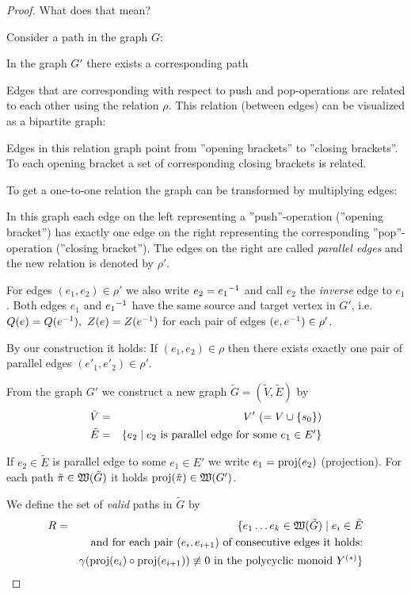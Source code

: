 \begin{proof}
What does that mean?

Consider a path in the graph $G$:

\missingfigure

In the graph $G'$ there exists a corresponding path

\missingfigure

Edges that are corresponding with respect to push and pop-operations are related
to each other using the relation $\rho$. This relation (between edges) can be
visualized as a bipartite graph:

\missingfigure

Edges in this relation graph point from ''opening brackets'' to ''closing
brackets''. To each opening bracket a set of corresponding closing brackets is
related. 

To get a one-to-one relation the graph can be transformed by multiplying edges:

\missingfigure

In this graph each edge on the left representing a ''push''-operation
(''opening bracket'') has exactly one edge on the right representing the
corresponding ''pop''-operation (''closing bracket''). The edges on the right
are called {\em parallel edges} and the new relation is denoted by $\rho'$.

For edges $(e_1, e_2) \in \rho'$ we also write $e_2 = \mbox{${e_1}^{-1}$}$ and call $e_2$
the {\em inverse} edge to $e_1$. Both edges $e_1$ and $\mbox{${e_1}^{-1}$}$ have the same
source and target vertex in $G'$, i.e.\ $Q(e) = Q(\mbox{${e}^{-1}$}),\ Z(e) = Z(\mbox{${e}^{-1}$})$
for each pair of edges $(e, \mbox{${e}^{-1}$}) \in \rho'$.

By our construction it holds: If $(e_1, e_2) \in \rho$ then there exists exactly
one pair of parallel edges $(e'_1, e'_2)  \in \rho'$.

From the graph $G'$ we construct a new graph $\tilde{G} = (\tilde{V},
\tilde{E})$ by
\begin{eqnarray*}
\tilde{V} &=& V' \ (=V \cup \mbox{$\{s_0\}$}) \\
\tilde{E} &=& \mbox{$\{e_2 \mid e_2\text{ is parallel edge for some $e_1 \in E'$}\}$}
\end{eqnarray*}

If $e_2 \in \tilde{E}$ is parallel edge to some $e_1 \in E'$ we write $e_1 =
\mathrm{proj}({e_2})$ (projection). For each path $\tilde{\pi} \in \mbox{$\mathfrak{W}({\tilde{G}})$}$ it
holds $\mathrm{proj}({\tilde{\pi}}) \in \mbox{$\mathfrak{W}({G'})$}$.

We define the set of {\em valid} paths in $\tilde{G}$ by
\begin{eqnarray*}
R &=& \{ e_1 \ldots e_k \in \mbox{$\mathfrak{W}({\tilde{G}})$} \mid e_i \in \tilde{E} \\
& & \text{and for each pair }(e_i, e_{i+1})\text{ of consecutive edges it
holds:}\\
& & \gamma(\mathrm{proj}({e_i}) \circ \mathrm{proj}({e_{i+1}})) \not\equiv 0\text{ in the
polycyclic monoid }\mbox{${Y}^{(*)}$} \}
\end{eqnarray*} 


\end{proof}
